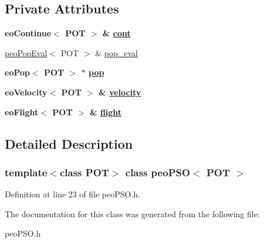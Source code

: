 \subsection*{Private Attributes}
\begin{CompactItemize}
\item 
\hypertarget{classpeoPSO_68cedd9e3dcc9789d618148a69fc7b29}{
\bf{eo\-Continue}$<$ POT $>$ \& \hyperlink{classpeoPSO_68cedd9e3dcc9789d618148a69fc7b29}{cont}}
\label{classpeoPSO_68cedd9e3dcc9789d618148a69fc7b29}

\item 
\hypertarget{classpeoPSO_98f84879b7952fe4150099d4720d5443}{
\hyperlink{classpeoPopEval}{peo\-Pop\-Eval}$<$ POT $>$ \& \hyperlink{classpeoPSO_98f84879b7952fe4150099d4720d5443}{pop\_\-eval}}
\label{classpeoPSO_98f84879b7952fe4150099d4720d5443}

\item 
\hypertarget{classpeoPSO_5f339ca31a1c9d701ecbaa900865bb8d}{
\bf{eo\-Pop}$<$ POT $>$ $\ast$ \hyperlink{classpeoPSO_5f339ca31a1c9d701ecbaa900865bb8d}{pop}}
\label{classpeoPSO_5f339ca31a1c9d701ecbaa900865bb8d}

\item 
\hypertarget{classpeoPSO_fb408c1b6cf2c1d586b0d96b92bdfbe6}{
\bf{eo\-Velocity}$<$ POT $>$ \& \hyperlink{classpeoPSO_fb408c1b6cf2c1d586b0d96b92bdfbe6}{velocity}}
\label{classpeoPSO_fb408c1b6cf2c1d586b0d96b92bdfbe6}

\item 
\hypertarget{classpeoPSO_3a53cfd80469cf104e62188a1f23690c}{
\bf{eo\-Flight}$<$ POT $>$ \& \hyperlink{classpeoPSO_3a53cfd80469cf104e62188a1f23690c}{flight}}
\label{classpeoPSO_3a53cfd80469cf104e62188a1f23690c}

\end{CompactItemize}


\subsection{Detailed Description}
\subsubsection*{template$<$class POT$>$ class peo\-PSO$<$ POT $>$}





Definition at line 23 of file peo\-PSO.h.

The documentation for this class was generated from the following file:\begin{CompactItemize}
\item 
peo\-PSO.h\end{CompactItemize}
